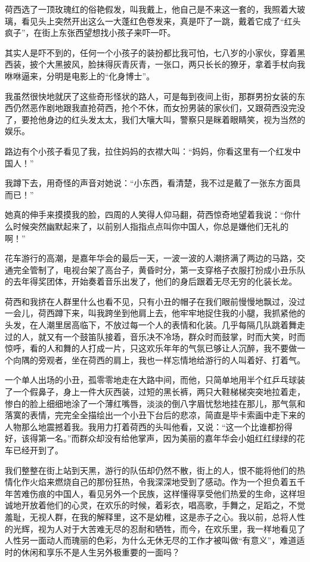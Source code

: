 \par 荷西选了一顶玫瑰红的俗艳假发，叫我戴上，他自己是不来这一套的，我照着大玻璃，看见头上突然开出这么一大蓬红色卷发来，真是吓了一跳，戴着它成了“红头疯子”，在街上东张西望想找小孩子来吓一吓。
\par 其实人是吓不到的，任何一个小孩子的装扮都比我可怕，七八岁的小家伙，穿着黑西装，披个大黑披风，脸抹得灰青灰青，一张口，两只长长的獠牙，拿着手杖向我咻咻逼来，分明是电影上的“化身博士”。
\par 我虽然很快地就厌了这些奇形怪状的路人，可是每到夜间上街，那群男扮女装的东西仍然恶作剧地跟我直抢荷西，抢个不休，而女扮男装的家伙们，又跟荷西没完没了，要抢他身边的红头发太太，我们大嚷大叫，警察只是眯着眼睛笑，视为当然的娱乐。
\par 路边有个小孩子看见了我，拉住妈妈的衣襟大叫：“妈妈，你看这里有一个红发中国人！”
\par 我蹲下去，用奇怪的声音对她说：“小东西，看清楚，我不过是戴了一张东方面具而已！”
\par 她真的伸手来摸摸我的脸，四周的人笑得人仰马翻，荷西惊奇地望着我说：“你什么时候突然幽默起来了，以前别人指指点点叫你中国人，你总是嫌他们无礼的啊！”
\par 花车游行的高潮，是嘉年华会的最后一天，一波一波的人潮挤满了两边的马路，交通完全管制了，电视台架了高台子，黄昏时分，第一支穿格子衣服打扮成小丑乐队的去年得奖团体，开始奏着音乐出发了，他们的身后跟着无尽无穷的化装长龙。
\par 荷西和我挤在人群里什么也看不见，只有小丑的帽子在我们眼前慢慢地飘过，没过一会儿，荷西蹲下来，叫我跨坐到他肩上去，他牢牢地捉住我的小腿，我抓紧他的头发，在人潮里居高临下，不放过每一个人的表情和化装。几乎每隔几队跳着舞走过的人，就又有一个鼓笛队接着，音乐决不冷场，群众时而鼓掌，时而大笑，时而惊呼，看的人和舞的人打成一片，只这欢乐年年的气氛已够让人沉醉，我不要做一个向隅的旁观者，坐在荷西的肩上，我也一样忘情地给游行的人叫着好、打着气。
\par 一个单人出场的小丑，孤零零地走在大路中间，而他，只简单地用半个红乒乓球装了一个假鼻子，身上一件大灰西装，过短的黑长裤，两只大鞋梯梯突突地拉着走，惨白的脸上细细地涂了一个薄红嘴唇，淡淡的倒八字眉忧愁地挂在那儿，那气氛和落寞的表情，完完全全描绘出一个小丑下台后的悲凉，简直是毕卡索画中走下来的人物那么地震撼着我。我用力打着荷西的头叫他看，又说：“这一个比谁都扮得好，该得第一名。”而群众却没有给他掌声，因为美丽的嘉年华会小姐红红绿绿的花车已经开到了。
\par 我们整整在街上站到天黑，游行的队伍却仍然不散，街上的人，恨不能将他们的热情化作火焰来燃烧自己的那份狂热，令我深深地受到了感动。作为一个担负着五千年苦难伤痕的中国人，看见另外一个民族，这样懂得享受他们热爱的生命，这样坦诚地开放着他们的心灵，在欢乐的时候，着彩衣，唱高歌，手舞之，足蹈之，不觉羞耻，无视人群，在我的解释里，这不是幼稚，这是赤子之心。我以前，总将人性的光辉，视为人对于大苦难无尽的忍耐和牺牲，而今，在欢乐里，我一样地看见了人性另一面动人而瑰丽的色彩，为什么无休无尽的工作才被叫做“有意义”，难道适时的休闲和享乐不是人生另外极重要的一面吗？
